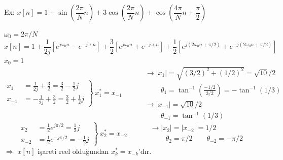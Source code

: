 \documentclass[11pt,a4paper]{article}
\begin{document}
\begin{ornek}
Ex: $x[n]=1+\sin\left(\dfrac{2\pi}{N}n\right)+3\cos\left(\dfrac{2\pi}{N}n\right)+\cos\left(\dfrac{4\pi}{N}n+\dfrac{\pi}{2}\right)$
\end{ornek}
$\omega_0=2\pi/N$
\[ x[n]=1+\frac{1}{2j}\left[e^{j\omega_0 n}-e^{-j\omega_0 n}\right]+\frac{3}{2}\left[e^{j\omega_0 n}+e^{-j\omega_0 n}\right]+\frac{1}{2}\left[e^{j(2\omega_0 n+\pi/2)}+e^{-j(2\omega_0 n+\pi/2)}\right] \]
$x_0=1$
\[ \left.\begin{aligned}
x_1 &= \frac{1}{2j}+\frac{3}{2}=\frac{3}{2}-\frac{1}{2}j\\[2mm]
x_{-1} &= -\frac{1}{2j}+\frac{3}{2}=\frac{3}{2}+\frac{1}{2}j
\end{aligned}\right\}\ x_1^{*}=x_{-1}
\qquad
\begin{aligned}
&\longrightarrow |x_1|=\sqrt{(3/2)^2+(1/2)^2}=\sqrt{10}/2\\
&\qquad\ \theta_1=\tan^{-1}\left(\frac{-1/2}{3/2}\right)=-\tan^{-1}(1/3)\\
&\longrightarrow |x_{-1}|=\sqrt{10}/2\\
&\qquad\ \theta_{-1}=\tan^{-1}(1/3)
\end{aligned} \]
\[ \left.\begin{aligned}
x_2 &= \frac{1}{2}e^{j\pi/2}=\frac{1}{2}j\\[1mm]
x_{-2} &= \frac{1}{2}e^{-j\pi/2}=-\frac{1}{2}j
\end{aligned}\right\}\ x_2^{*}=x_{-2}
\qquad
\begin{aligned}
&\longrightarrow |x_2|=|x_{-2}|=1/2\\
&\qquad\ \theta_2=\pi/2 \qquad \theta_{-2}=-\pi/2
\end{aligned} \]
$\Rightarrow$ $x[n]$ işareti reel olduğundan $x_k^{*}=x_{-k}$'dır.
\end{document}
